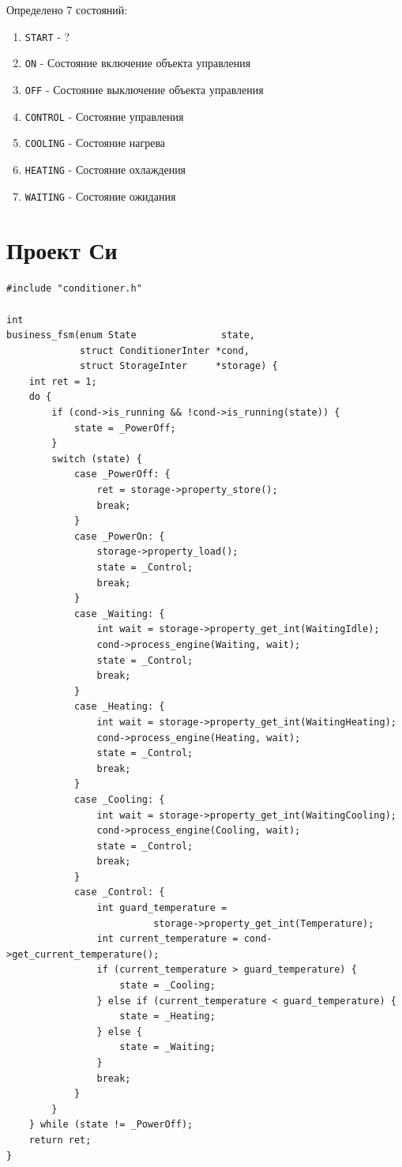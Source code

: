 \documentclass[12pt, twoside]{report}
\begin{document}
Определено 7 состояний:
\begin{enumerate}
  \item \texttt{START} - ?
  \item \texttt{ON} - Состояние включение объекта управления
  \item \texttt{OFF} - Состояние выключение объекта управления
  \item \texttt{CONTROL} - Состояние управления
  \item \texttt{COOLING} - Состояние нагрева
  \item \texttt{HEATING} - Состояние охлаждения
  \item \texttt{WAITING} - Состояние ожидания
\end{enumerate}

\newpage
\section*{Проект Си}\label{practical_work_3}

\begin{lstlisting}[label={main_c_fsm}, caption={Пример управления состояниями на \texttt{C}}]
#include "conditioner.h"

int
business_fsm(enum State               state, 
             struct ConditionerInter *cond, 
             struct StorageInter     *storage) {
    int ret = 1;
    do {
        if (cond->is_running && !cond->is_running(state)) {
            state = _PowerOff;
        }
        switch (state) {
            case _PowerOff: {
                ret = storage->property_store();
                break;
            }
            case _PowerOn: {
                storage->property_load();
                state = _Control;
                break;
            }
            case _Waiting: {
                int wait = storage->property_get_int(WaitingIdle);
                cond->process_engine(Waiting, wait);
                state = _Control;
                break;
            }
            case _Heating: {
                int wait = storage->property_get_int(WaitingHeating);
                cond->process_engine(Heating, wait);
                state = _Control;
                break;
            }
            case _Cooling: {
                int wait = storage->property_get_int(WaitingCooling);
                cond->process_engine(Cooling, wait);
                state = _Control;
                break;
            }
            case _Control: {
                int guard_temperature = 
                          storage->property_get_int(Temperature);
                int current_temperature = cond->get_current_temperature();
                if (current_temperature > guard_temperature) {
                    state = _Cooling;
                } else if (current_temperature < guard_temperature) {
                    state = _Heating;
                } else {
                    state = _Waiting;
                }
                break;
            }
        }
    } while (state != _PowerOff);
    return ret;
}
\end{lstlisting}
\end{document}
